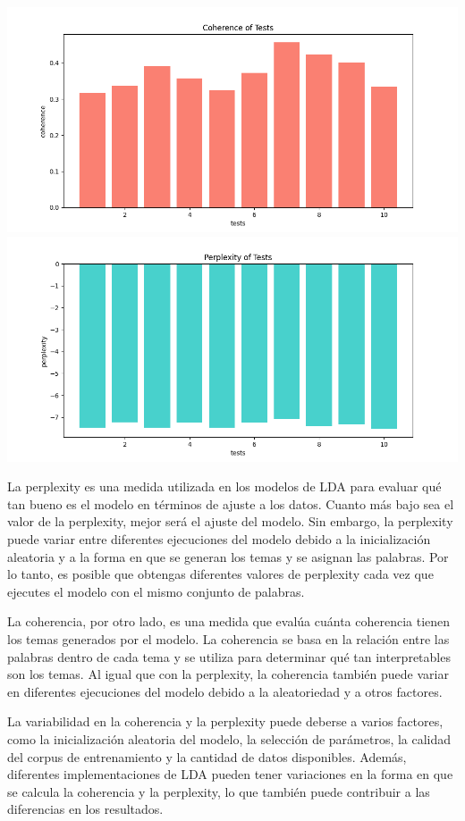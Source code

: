 \documentclass[10pt]{article} %
\begin{document}
	\begin{center}
		\includegraphics[scale=0.6]{images/coherence_stopwords}
		\includegraphics[scale=0.6]{images/perplexity_stopwords}
	\end{center}
	
	La perplexity es una medida utilizada en los modelos de LDA para evaluar qué tan bueno es el modelo en términos de ajuste a los datos. Cuanto más bajo sea el valor de la perplexity, mejor será el ajuste del modelo. Sin embargo, la perplexity puede variar entre diferentes ejecuciones del modelo debido a la inicialización aleatoria y a la forma en que se generan los temas y se asignan las palabras. Por lo tanto, es posible que obtengas diferentes valores de perplexity cada vez que ejecutes el modelo con el mismo conjunto de palabras.
	
	La coherencia, por otro lado, es una medida que evalúa cuánta coherencia tienen los temas generados por el modelo. La coherencia se basa en la relación entre las palabras dentro de cada tema y se utiliza para determinar qué tan interpretables son los temas. Al igual que con la perplexity, la coherencia también puede variar en diferentes ejecuciones del modelo debido a la aleatoriedad y a otros factores.
	
	La variabilidad en la coherencia y la perplexity puede deberse a varios factores, como la inicialización aleatoria del modelo, la selección de parámetros, la calidad del corpus de entrenamiento y la cantidad de datos disponibles. Además, diferentes implementaciones de LDA pueden tener variaciones en la forma en que se calcula la coherencia y la perplexity, lo que también puede contribuir a las diferencias en los resultados.
	
\end{document}
